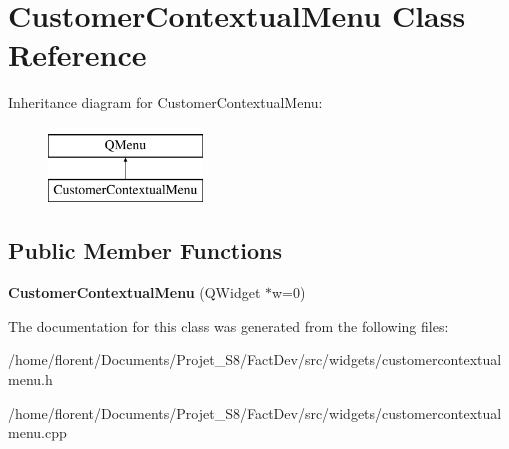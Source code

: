 \hypertarget{classCustomerContextualMenu}{\section{Customer\-Contextual\-Menu Class Reference}
\label{classCustomerContextualMenu}
}
Inheritance diagram for Customer\-Contextual\-Menu\-:\begin{figure}[H]
\begin{center}
\leavevmode
\includegraphics[height=2.000000cm]{d5/db9/classCustomerContextualMenu}
\end{center}
\end{figure}
\subsection*{Public Member Functions}
\begin{DoxyCompactItemize}
\item 
\hypertarget{classCustomerContextualMenu_a798a08f4b8526398a54752e7de87930e}{{\bfseries Customer\-Contextual\-Menu} (Q\-Widget $\ast$w=0)}\label{classCustomerContextualMenu_a798a08f4b8526398a54752e7de87930e}

\end{DoxyCompactItemize}


The documentation for this class was generated from the following files\-:\begin{DoxyCompactItemize}
\item 
/home/florent/\-Documents/\-Projet\-\_\-\-S8/\-Fact\-Dev/src/widgets/customercontextualmenu.\-h\item 
/home/florent/\-Documents/\-Projet\-\_\-\-S8/\-Fact\-Dev/src/widgets/customercontextualmenu.\-cpp\end{DoxyCompactItemize}
